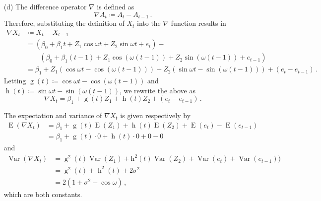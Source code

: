 \documentclass[10pt]{fphw}
\theoremstyle{definition}
\newcommand{\var}{\operatorname{Var}}
\newcommand{\expect}{\operatorname{E}}
\begin{document}
\begin{enumerate}
\item[(d)] The difference operator $\nabla$ is defined as
\begin{equation}
    \nabla A_t \coloneqq A_t - A_{t-1}\,.
\end{equation}
Therefore, substituting the definition of $X_t$ into the $\nabla$ function results in
\begin{equation*}
\begin{split}
    \nabla X_t
        &\coloneqq X_t - X_{t-1}\\
        &= \left(\beta_0 + \beta_1 t + Z_1 \cos \omega t + Z_2 \sin \omega t + e_t\right) -\\
           &\qquad\left(\beta_0 + \beta_1 (t-1) + Z_1 \cos(\omega (t-1)) + Z_2 \sin(\omega (t-1)) + e_{t-1}\right)\\
        &= \beta_1 + Z_1 (\cos \omega t - \cos(\omega (t-1))) + Z_2 (\sin \omega t - \sin(\omega (t-1))) + (e_t - e_{t-1})\,.
\end{split}
\end{equation*}
Letting $\operatorname{g}(t) \coloneqq \cos \omega t - \cos(\omega(t-1))$ and $\operatorname{h}(t) \coloneqq \sin \omega t - \sin(\omega(t-1))$,
we rewrite the above as
\begin{equation}
    \nabla X_t = \beta_1 + \operatorname{g}(t) Z_1  + \operatorname{h}(t) Z_2 + (e_t - e_{t-1})\,.
\end{equation}


The expectation and variance of $\nabla X_t$ is given respectively by
\begin{align*}
    \expect(\nabla X_t)
        &= \beta_1 + \operatorname{g}(t) \expect(Z_1) + \operatorname{h}(t) \expect(Z_2) + \expect(e_t) - \expect(e_{t-1})\\
        &= \beta_1 + \operatorname{g}(t) \cdot 0 + \operatorname{h}(t) \cdot 0 + 0 - 0
\end{align*}
and
\begin{align*}
\var(\nabla X_t)
    &= \operatorname{g}^2(t) \var(Z_1) + \operatorname{h^2}(t)\var(Z_2) + \var(e_t) + \var(e_{t-1}))\\
    &= \operatorname{g}^2(t) + \operatorname{h}^2(t) + 2 \sigma^2\\
    &= 2(1+\sigma^2-\cos \omega)\,,
\end{align*}
which are both constants.


\end{enumerate}
\end{document}
